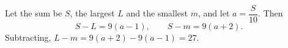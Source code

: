 Let the sum be $S$, the largest $L$ and the smallest $m$, and let $a=\dfrac {S}{10}$. Then
\[
S-L=9(a-1),\qquad S-m=9(a+2).
\]
Subtracting, $L-m=9(a+2)-9(a-1)=\boxed{27}$.
